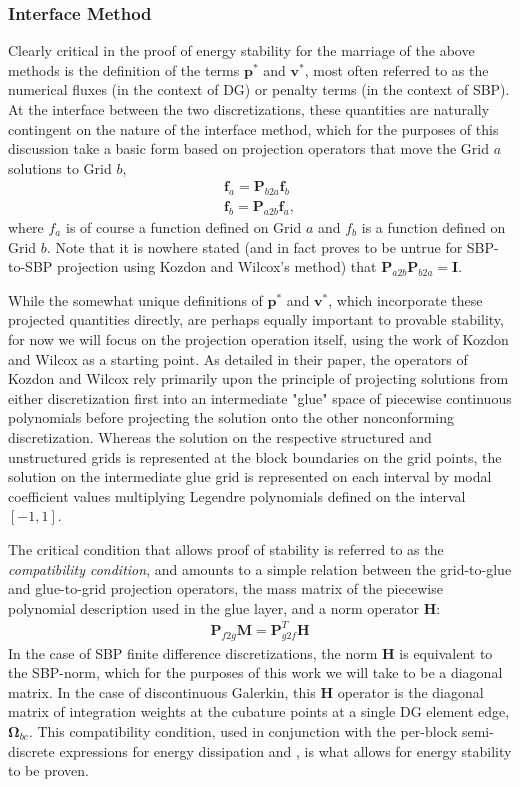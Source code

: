 \subsubsection{Interface Method} \label{sec:interface}

Clearly critical in the proof of energy stability for the marriage of the
above methods is the definition of the terms $\pmb{p}^*$ and $\pmb{v}^*$, most
often referred to as the numerical fluxes (in the context of DG) or penalty terms
(in the context of SBP). At the interface between the two discretizations, these
quantities are naturally contingent on the nature of the interface method, which
for the purposes of this discussion take a basic form based on projection operators
that move the Grid $a$ solutions to Grid $b$,
\begin{align}
\pmb{f}_{a} = \pmb{P}_{b2a}\pmb{f}_{b} \\
\pmb{f}_{b} = \pmb{P}_{a2b}\pmb{f}_{a},
\end{align}
where $f_{a}$ is of course a function defined on Grid $a$ and $f_{b}$ is a function
defined on Grid $b$. Note that it is nowhere stated (and in fact proves to be untrue
for SBP-to-SBP projection using Kozdon and Wilcox's method) that $\pmb{P}_{a2b}\pmb{P}_{b2a} = \pmb{I}$.

While the somewhat unique definitions of $\pmb{p}^{*}$ and
$\pmb{v}^{*}$, which incorporate these projected quantities directly, are perhaps
equally important to provable stability, for now we will focus on the projection
operation itself, using the work of Kozdon and Wilcox as a starting point.
As detailed in their paper, the operators of Kozdon and Wilcox rely primarily
upon the principle of projecting solutions from either discretization
first into an intermediate "glue" space of piecewise continuous polynomials
before projecting the solution onto the other nonconforming discretization. Whereas
the solution on the respective structured and unstructured grids is represented at
the block boundaries on the grid points, the solution on the intermediate glue grid
is represented on each interval by modal coefficient values multiplying Legendre
polynomials defined on the interval $[-1,1]$.

The critical condition that allows proof of stability is referred to as the
\emph{compatibility condition}, and amounts to a simple relation between the
grid-to-glue and glue-to-grid projection operators, the mass matrix of the
piecewise polynomial description used in the glue layer, and a norm operator
$\pmb{H}$:
\begin{align}
\pmb{P}_{f2g}\pmb{M} = \pmb{P}_{g2f}^{T}\pmb{H} \label{eq:compat}
\end{align}
In the case of SBP finite difference discretizations, the norm $\pmb{H}$ is equivalent
to the SBP-norm, which for the purposes of this work we will take to be
a diagonal matrix. In the case of discontinuous Galerkin, this $\pmb{H}$ operator is
the diagonal matrix of integration weights at the cubature points at a single
DG element edge, $\pmb{\Omega}_{bc}$.  This compatibility condition, used in conjunction with
the per-block semi-discrete expressions for energy dissipation  and
, is what allows for energy stability to be proven.

